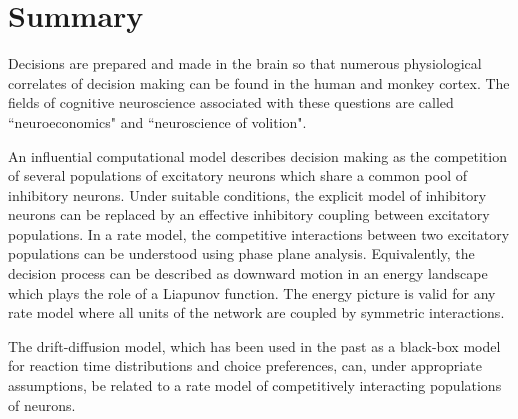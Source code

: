\documentclass[12pt,hyperref,a4paper,UTF8]{ctexart}
\begin{document}
\section{Summary}

Decisions are prepared and made in the brain so that numerous physiological correlates of decision making can be found in the human and monkey cortex. The fields of cognitive neuroscience associated with these questions are called ``neuroeconomics" and ``neuroscience of volition".

An influential computational model describes decision making as the competition of several populations of excitatory neurons which share a common pool of inhibitory neurons. Under suitable conditions, the explicit model of inhibitory neurons can be replaced by an effective inhibitory coupling between excitatory populations. In a rate model, the competitive interactions between two excitatory populations can be understood using phase plane analysis. Equivalently, the decision process can be described as downward motion in an energy landscape which plays the role of a Liapunov function. The energy picture is valid for any rate model where all units of the network are coupled by symmetric interactions.

The drift-diffusion model, which has been used in the past as a black-box model for reaction time distributions and choice preferences, can, under appropriate assumptions, be related to a rate model of competitively interacting populations of neurons.

\newpage
{}




\end{document}
